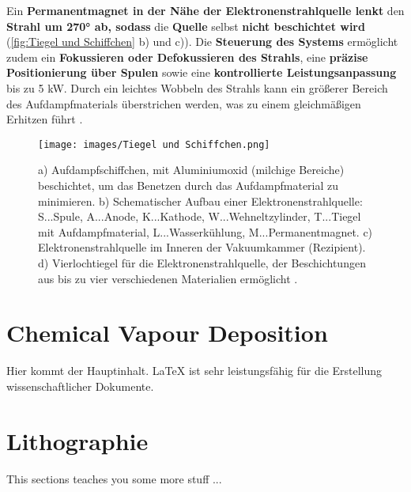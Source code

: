 \documentclass{article} %
\begin{document}
\vspace{1em}

Ein \textbf{Permanentmagnet in der Nähe der Elektronenstrahlquelle lenkt} den \textbf{Strahl um 270° ab, sodass} die \textbf{Quelle} selbst \textbf{nicht beschichtet wird} 
(\autoref{fig:Tiegel und Schiffchen} b) und c)). Die \textbf{Steuerung des Systems} ermöglicht zudem ein \textbf{Fokussieren oder Defokussieren des Strahls}, 
eine \textbf{präzise Positionierung über Spulen} sowie eine \textbf{kontrollierte Leistungsanpassung} bis zu 5 kW. Durch ein leichtes Wobbeln des Strahls kann 
ein größerer Bereich des Aufdampfmaterials überstrichen werden, was zu einem gleichmäßigen Erhitzen führt \cite{keplinger2024}.

\begin{figure}[ht]
    \centering
    \texttt{[image: images/Tiegel und Schiffchen.png]} %
    \captionsetup{labelfont=bf} %
    \caption{%
    a) Aufdampfschiffchen, mit Aluminiumoxid (milchige Bereiche) beschichtet, um das Benetzen durch das Aufdampfmaterial zu minimieren. 
    b) Schematischer Aufbau einer Elektronenstrahlquelle: S...Spule, A...Anode, K...Kathode, W...Wehneltzylinder, T...Tiegel mit Aufdampfmaterial, L...Wasserkühlung, M...Permanentmagnet.  
    c) Elektronenstrahlquelle im Inneren der Vakuumkammer (Rezipient). 
    d) Vierlochtiegel für die Elektronenstrahlquelle, der Beschichtungen aus bis zu vier verschiedenen Materialien ermöglicht \cite{keplinger2024}.
}
    \label{fig:Tiegel und Schiffchen}
\end{figure}

\vspace{1em}
\section{Chemical Vapour Deposition} %
Hier kommt der Hauptinhalt. \LaTeX{} ist sehr leistungsfähig für die Erstellung wissenschaftlicher Dokumente.

\vspace{1em}
\section{Lithographie} %
This sections teaches you some more stuff ...

\newpage
\end{document}
